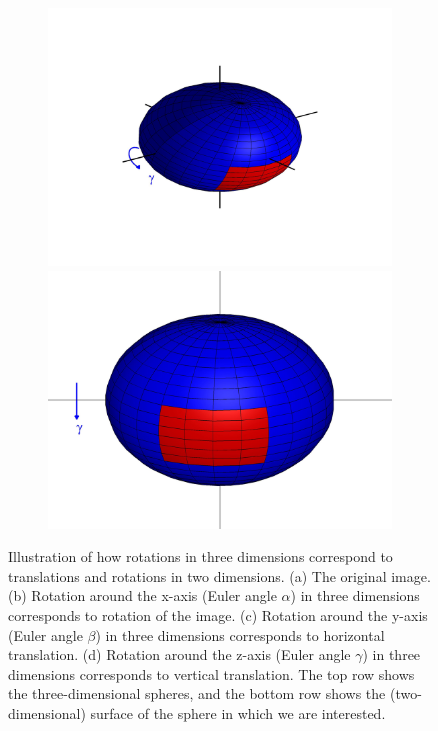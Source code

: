 \documentclass{pnastwo}
\begin{document}
\begin{figure}
\begin{subfigure}{0.2\textwidth}
\caption{}
\end{subfigure}
\begin{subfigure}{0.2\textwidth}
\includegraphics[width=\textwidth]{sphere_4}
\includegraphics[width=\textwidth]{sphere2_4}
\caption{}
\end{subfigure}
\caption{Illustration of how rotations in three dimensions correspond to translations and rotations in two dimensions. (a) The original image. (b) Rotation around the x-axis (Euler angle $\alpha$) in three dimensions corresponds to rotation of the image. (c) Rotation around the y-axis (Euler angle $\beta$) in three dimensions corresponds to horizontal translation. (d) Rotation around the z-axis (Euler angle $\gamma$) in three dimensions corresponds to vertical translation. The top row shows the three-dimensional spheres, and the bottom row shows the (two-dimensional) surface of the sphere in which we are interested.}
\label{fig:SO3_picture}
\end{figure}
\end{document}
